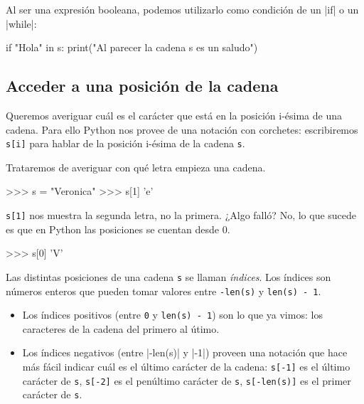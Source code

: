 Al ser una expresión booleana, podemos utilizarlo como condición de un |if| o
un |while|:

\begin{codigo-python-sn}
if "Hola" in s:
    print("Al parecer la cadena s es un saludo")
\end{codigo-python-sn}

\subsection{Acceder a una posición de la cadena}

Queremos averiguar cuál es el carácter que está en la posición i-ésima de
una cadena.  Para ello Python nos provee de una notación con corchetes:
escribiremos \lstinline+s[i]+ para hablar de la posición i-ésima de la cadena
\lstinline!s!.

Trataremos de averiguar con qué letra empieza una cadena.

\begin{codigo-python-sn}
>>> s = "Veronica"
>>> s[1]
'e'
\end{codigo-python-sn}

\lstinline+s[1]+ nos muestra la segunda letra, no la primera. ¿Algo falló? No,
lo que sucede es que en Python las posiciones se cuentan desde 0.

\begin{codigo-python-sn}
>>> s[0]
'V'
\end{codigo-python-sn}

\begin{observacion}
Las distintas posiciones de una cadena \lstinline!s! se llaman
\emph{índices}. Los índices son números enteros que pueden tomar
valores entre \lstinline!-len(s)! y \lstinline!len(s) - 1!.

\begin{itemize}
\item Los índices positivos (entre \lstinline!0! y \lstinline!len(s) - 1!) son lo que
ya vimos: los caracteres de la cadena del primero al útimo.

\item Los índices negativos (entre |-len(s)| y |-1|) proveen una notación que hace
más fácil indicar cuál es el último
carácter de la cadena: \lstinline!s[-1]! es el último carácter de
\lstinline!s!, \lstinline!s[-2]! es el penúltimo carácter de \lstinline!s!,
\lstinline!s[-len(s)]! es el primer carácter de \lstinline!s!.
\end{itemize}
\end{observacion}

